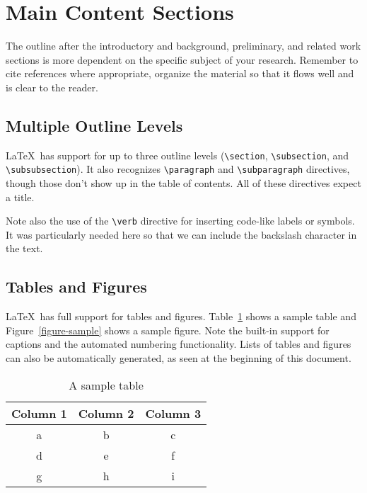 \documentclass{article}
\begin{document}
\section{Main Content Sections}

The outline after the introductory and background, preliminary, and related work sections is more dependent on the specific subject of your research.  Remember to cite references where appropriate, organize the material so that it flows well and is clear to the reader.

\subsection{Multiple Outline Levels}

\LaTeX\ has support for up to three outline levels (\verb!\section!, \verb!\subsection!, and \verb!\subsubsection!).  It also recognizes \verb!\paragraph! and \verb!\subparagraph! directives, though those don't show up in the table of contents.  All of these directives expect a title.

Note also the use of the \verb!\verb! directive for inserting code-like labels or symbols.  It was particularly needed here so that we can include the backslash character in the text.

\subsection{Tables and Figures}

\LaTeX\ has full support for tables and figures.  Table~\ref{table-sample} shows a sample table and Figure~\ref{figure-sample} shows a sample figure.  Note the built-in support for captions and the automated numbering functionality.  Lists of tables and figures can also be automatically generated, as seen at the beginning of this document.

\begin{table}
\centering
\begin{tabular}{|c|c|c|}\hline
Column 1 & Column 2 & Column 3 \\\hline\hline
a & b & c \\
d & e & f \\
g & h & i \\\hline
\end{tabular}

\caption{A sample table}
\label{table-sample}
\end{table}
\end{document}
